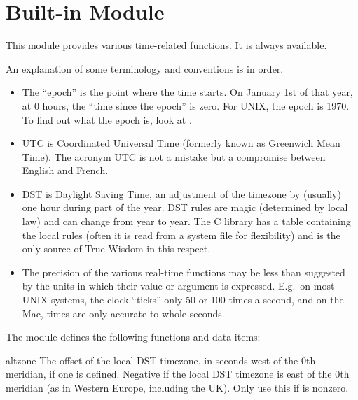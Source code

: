 \section{Built-in Module }

This module provides various time-related functions.
It is always available.

An explanation of some terminology and conventions is in order.

\begin{itemize}

\item
The ``epoch'' is the point where the time starts.  On January 1st of that
year, at 0 hours, the ``time since the epoch'' is zero.  For UNIX, the
epoch is 1970.  To find out what the epoch is, look at .

\item
UTC is Coordinated Universal Time (formerly known as Greenwich Mean
Time).  The acronym UTC is not a mistake but a compromise between
English and French.

\item
DST is Daylight Saving Time, an adjustment of the timezone by
(usually) one hour during part of the year.  DST rules are magic
(determined by local law) and can change from year to year.  The C
library has a table containing the local rules (often it is read from
a system file for flexibility) and is the only source of True Wisdom
in this respect.

\item
The precision of the various real-time functions may be less than
suggested by the units in which their value or argument is expressed.
E.g.\ on most UNIX systems, the clock ``ticks'' only 50 or 100 times a
second, and on the Mac, times are only accurate to whole seconds.

\end{itemize}

The module defines the following functions and data items:

\renewcommand{\indexsubitem}{(in module time)}

\begin{datadesc}{altzone}
The offset of the local DST timezone, in seconds west of the 0th
meridian, if one is defined.  Negative if the local DST timezone is
east of the 0th meridian (as in Western Europe, including the UK).
Only use this if  is nonzero.
\end{datadesc}


